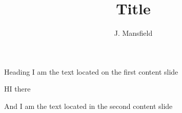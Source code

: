 \documentclass{beamer}
\title{Title}
\author{J. Mansfield}
\institute{Regis~University\\ 
                    3333~Regis~Boulevard\\
                    Denver~Colorado~80221-1099\\                    
                    \url{http://www.regis.edu/} 
}
\begin{document}
\begin{frame}
\titlepage
\end{frame}

\begin{frame}
\begin{block}{Heading}
I am the text located on the first content slide
\end{block}
HI there
\end{frame}

\begin{frame}
And I am the text located in the second content slide
\end{frame}
\end{document}
